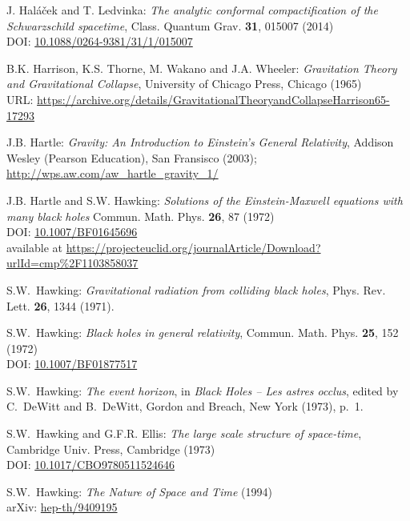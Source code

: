 \begin{thebibliography}{123}
J. Hal\'a\v{c}ek and T. Ledvinka:
{\em The analytic conformal compactification of the Schwarzschild spacetime},
Class. Quantum Grav. {\bf 31}, 015007 (2014)\\
DOI: \href{https://doi.org/10.1088/0264-9381/31/1/015007}{10.1088/0264-9381/31/1/015007}

B.K. Harrison, K.S. Thorne, M. Wakano and J.A. Wheeler:
{\em Gravitation Theory and Gravitational Collapse},
University of Chicago Press, Chicago (1965)\\
URL: {\footnotesize\url{https://archive.org/details/GravitationalTheoryandCollapseHarrison65-17293}}

J.B. Hartle: \emph{Gravity: An Introduction to Einstein's General Relativity},
Addison Wesley (Pearson Education), San Fransisco (2003); \\
\url{http://wps.aw.com/aw_hartle_gravity_1/}

J.B. Hartle and S.W. Hawking:
{\em Solutions of the Einstein-Maxwell equations with many black holes}
Commun. Math. Phys. {\bf 26}, 87 (1972)\\
DOI: \href{https://doi.org/10.1007/BF01645696}{10.1007/BF01645696}\\
available at \url{https://projecteuclid.org/journalArticle/Download?urlId=cmp%2F1103858037}

S.W.~Hawking: {\em Gravitational radiation from colliding black holes},
Phys. Rev. Lett. {\bf 26}, 1344 (1971).

S.W.~Hawking: {\em Black holes in general relativity},
Commun. Math. Phys. {\bf 25}, 152 (1972)\\
DOI: \href{https://doi.org/10.1007/BF01877517}{10.1007/BF01877517}

S.W.~Hawking: {\em The event horizon},
in {\em Black Holes -- Les astres occlus}, edited by C.~DeWitt and B.~DeWitt,
Gordon and Breach, New York (1973), p.~1.

S.W.~Hawking and G.F.R. Ellis: {\em The large scale structure of
space-time},
Cambridge Univ. Press, Cambridge (1973)\\
DOI: \href{https://doi.org/10.1017/CBO9780511524646}{10.1017/CBO9780511524646}

S.W.~Hawking: {\em The Nature of Space and Time} (1994)\\
arXiv: \href{https://arxiv.org/abs/hep-th/9409195}{hep-th/9409195}


\end{thebibliography}
